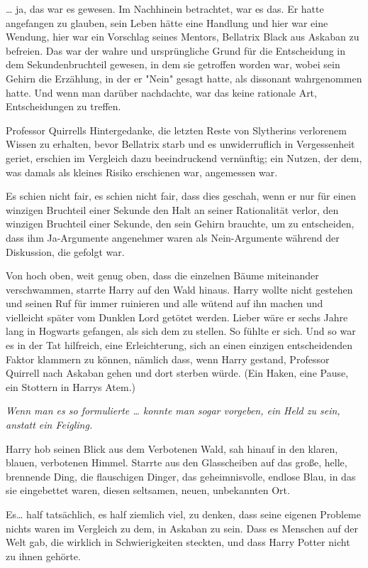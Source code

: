 {… ja, das war es gewesen. Im Nachhinein betrachtet, war es das. Er hatte angefangen zu glauben, sein Leben hätte eine Handlung und hier war eine Wendung, hier war ein Vorschlag seines Mentors, Bellatrix Black aus Askaban zu befreien. Das war der wahre und ursprüngliche Grund für die Entscheidung in dem Sekundenbruchteil gewesen, in dem sie getroffen worden war, wobei sein Gehirn die Erzählung, in der er "Nein" gesagt hatte, als dissonant wahrgenommen hatte. Und wenn man darüber nachdachte, war das keine rationale Art, Entscheidungen zu treffen.

Professor Quirrells Hintergedanke, die letzten Reste von Slytherins verlorenem Wissen zu erhalten, bevor Bellatrix starb und es unwiderruflich in Vergessenheit geriet, erschien im Vergleich dazu beeindruckend vernünftig; ein Nutzen, der dem, was damals als kleines Risiko erschienen war, angemessen war.

Es schien nicht fair, es schien nicht fair, dass dies geschah, wenn er nur für einen winzigen Bruchteil einer Sekunde den Halt an seiner Rationalität verlor, den winzigen Bruchteil einer Sekunde, den sein Gehirn brauchte, um zu entscheiden, dass ihm Ja-Argumente angenehmer waren als Nein-Argumente während der Diskussion, die gefolgt war.

Von hoch oben, weit genug oben, dass die einzelnen Bäume miteinander verschwammen, starrte Harry auf den Wald hinaus. Harry wollte nicht gestehen und seinen Ruf für immer ruinieren und alle wütend auf ihn machen und vielleicht später vom Dunklen Lord getötet werden. Lieber wäre er sechs Jahre lang in Hogwarts gefangen, als sich dem zu stellen. So fühlte er sich. Und so war es in der Tat hilfreich, eine Erleichterung, sich an einen einzigen entscheidenden Faktor klammern zu können, nämlich dass, wenn Harry gestand, Professor Quirrell nach Askaban gehen und dort sterben würde. (Ein Haken, eine Pause, ein Stottern in Harrys Atem.)

\emph{Wenn man es so formulierte … konnte man sogar vorgeben, ein Held zu sein, anstatt ein Feigling.}

Harry hob seinen Blick aus dem Verbotenen Wald, sah hinauf in den klaren, blauen, verbotenen Himmel. Starrte aus den Glasscheiben auf das große, helle, brennende Ding, die flauschigen Dinger, das geheimnisvolle, endlose Blau, in das sie eingebettet waren, diesen seltsamen, neuen, unbekannten Ort.

Es… half tatsächlich, es half ziemlich viel, zu denken, dass seine eigenen Probleme nichts waren im Vergleich zu dem, in Askaban zu sein. Dass es Menschen auf der Welt gab, die wirklich in Schwierigkeiten steckten, und dass Harry Potter nicht zu ihnen gehörte.

}
